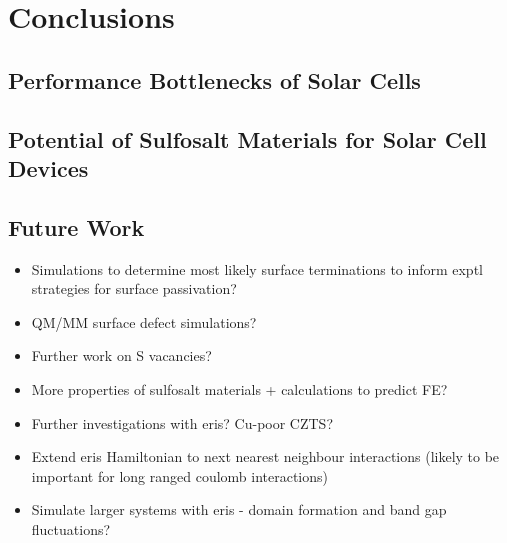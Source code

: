 
\chapter{Conclusions}

\label{ch:conclusions}

\section{Performance Bottlenecks of  {\CZTS } Solar Cells}
\section{Potential of Sulfosalt Materials for Solar Cell Devices}

\section{Future Work}

\begin{itemize}
\item Simulations to determine most likely surface terminations to inform exptl strategies for surface passivation?
\item QM/MM surface defect simulations?
\item Further work on S vacancies?
\item More properties of sulfosalt materials + calculations to predict FE?
\item Further investigations with eris? Cu-poor CZTS?
\item Extend eris Hamiltonian to next nearest neighbour interactions (likely to be important for long ranged coulomb interactions)
\item Simulate larger systems with eris - domain formation and band gap fluctuations?
\end{itemize}

 